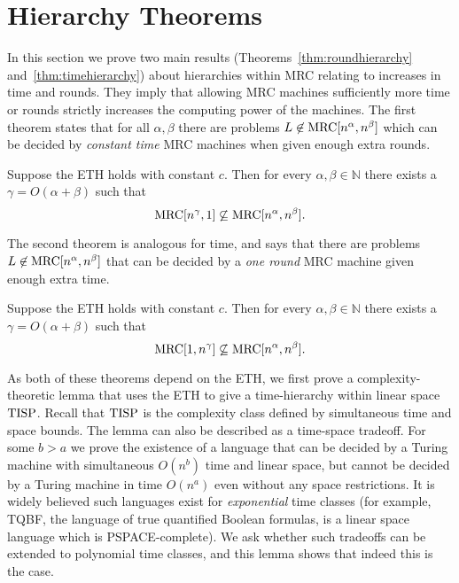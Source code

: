 \documentclass{llncs}
\newcommand{\mrc}{\textup{MRC}}
\newcommand{\TISP}{\textup{TISP}}
\begin{document}
\section{Hierarchy Theorems}\label{sec:hierarchy}

In this section we prove two main results (Theorems~\ref{thm:roundhierarchy}
and~\ref{thm:timehierarchy}) about hierarchies within MRC relating to increases
in time and rounds.  They imply that allowing MRC machines sufficiently more
time or rounds strictly increases the computing power of the machines.  The
first theorem states that for all $\alpha, \beta$ there are problems $L \not
\in \mrc[n^\alpha, n^\beta]$ which can be decided by \emph{constant time} MRC
machines when given enough extra rounds.

\begin{theorem} \label{thm:roundhierarchy}
Suppose the ETH holds with constant $c$. Then for every $\alpha,\beta\in\mathbb N$
there exists a $\gamma = O(\alpha + \beta)$ such that $$\mrc[n^\gamma,1]
\not\subseteq \mrc[n^\alpha, n^\beta].$$
\end{theorem}

The second theorem is analogous for time, and says that there are problems $L
\not \in \mrc[n^\alpha, n^\beta]$ that can be decided by a \emph{one round} MRC
machine given enough extra time.

\begin{theorem} \label{thm:timehierarchy}
Suppose the ETH holds with constant $c$. Then for every $\alpha,\beta\in\mathbb N$
there exists a $\gamma = O(\alpha + \beta)$ such that $$\mrc[1, n^\gamma]
\not\subseteq \mrc[n^\alpha, n^\beta].$$
\end{theorem}

As both of these theorems depend on the ETH, we first prove a complexity-theoretic
lemma that uses the ETH to give a time-hierarchy within linear space $\TISP$.
Recall that $\TISP$ is the complexity class defined by simultaneous time and 
space bounds.
The lemma can also be described as a time-space tradeoff.
For some $b > a$ we prove
the existence of a language that can be decided by a Turing machine with
simultaneous $O(n^b)$ time and linear space, but cannot be decided by a Turing
machine in time $O(n^a)$ even without any space restrictions. It is widely
believed such languages exist for \emph{exponential} time classes (for example,
TQBF, the language of true quantified Boolean formulas, is a linear space
language which is PSPACE-complete). We ask whether such tradeoffs can be
extended to polynomial time classes, and this lemma shows that indeed this is
the case.
\end{document}
